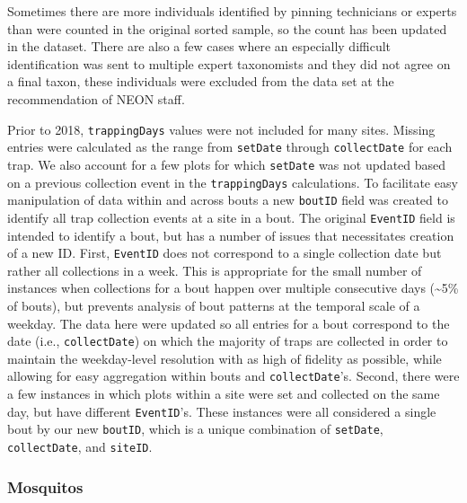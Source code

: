 \documentclass[
  12pt,
]{article}
\begin{document}
Sometimes there are more individuals identified by pinning technicians or experts than were counted in the original sorted sample, so the count has been updated in the dataset. There are also a few cases where an especially difficult identification was sent to multiple expert taxonomists and they did not agree on a final taxon, these individuals were excluded from the data set at the recommendation of NEON staff.

Prior to 2018, \texttt{trappingDays} values were not included for many sites. Missing entries were calculated as the range from \texttt{setDate} through \texttt{collectDate} for each trap. We also account for a few plots for which \texttt{setDate} was not updated based on a previous collection event in the \texttt{trappingDays} calculations. To facilitate easy manipulation of data within and across bouts a new \texttt{boutID} field was created to identify all trap collection events at a site in a bout. The original \texttt{EventID} field is intended to identify a bout, but has a number of issues that necessitates creation of a new ID. First, \texttt{EventID} does not correspond to a single collection date but rather all collections in a week. This is appropriate for the small number of instances when collections for a bout happen over multiple consecutive days (\textasciitilde5\% of bouts), but prevents analysis of bout patterns at the temporal scale of a weekday. The data here were updated so all entries for a bout correspond to the date (i.e., \texttt{collectDate}) on which the majority of traps are collected in order to maintain the weekday-level resolution with as high of fidelity as possible, while allowing for easy aggregation within bouts and \texttt{collectDate}'s. Second, there were a few instances in which plots within a site were set and collected on the same day, but have different \texttt{EventID}'s. These instances were all considered a single bout by our new \texttt{boutID}, which is a unique combination of \texttt{setDate}, \texttt{collectDate}, and \texttt{siteID}.

\hypertarget{mosquitos}{%
\subsubsection{Mosquitos}\label{mosquitos}}
\end{document}
